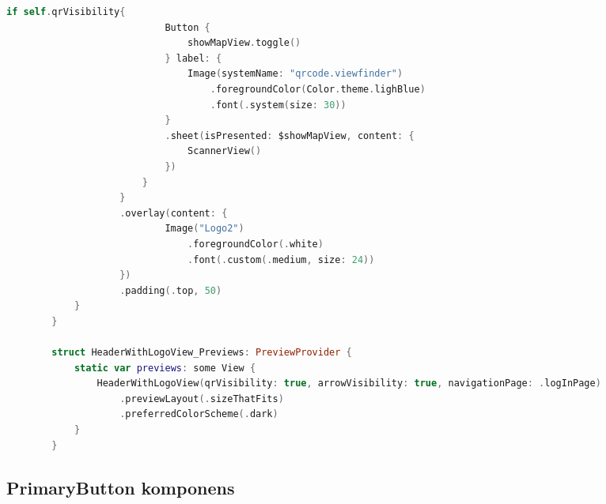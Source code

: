 \begin{spacing}{2}
\end{spacing}
\hspace*{-10mm}
\begin{minipage}{\textwidth}
    \linespread{0.8}\selectfont
    \begin{lstlisting}[language=swift]
                if self.qrVisibility{
                            Button {
                                showMapView.toggle()
                            } label: {
                                Image(systemName: "qrcode.viewfinder")
                                    .foregroundColor(Color.theme.lighBlue)
                                    .font(.system(size: 30))
                            }
                            .sheet(isPresented: $showMapView, content: {
                                ScannerView()
                            })
                        }
                    }
                    .overlay(content: {
                            Image("Logo2")
                                .foregroundColor(.white)
                                .font(.custom(.medium, size: 24))
                    })
                    .padding(.top, 50)
            }
        }

        struct HeaderWithLogoView_Previews: PreviewProvider {
            static var previews: some View {
                HeaderWithLogoView(qrVisibility: true, arrowVisibility: true, navigationPage: .logInPage)
                    .previewLayout(.sizeThatFits)
                    .preferredColorScheme(.dark)
            }
        }

    \end{lstlisting}   
\end{minipage}


\subsection*{PrimaryButton komponens}

